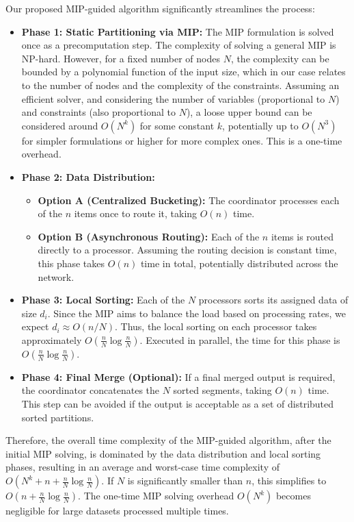 \documentclass[]{interact}
\theoremstyle{plain}
\theoremstyle{definition}
\theoremstyle{remark}
\begin{document}
Our proposed MIP-guided algorithm significantly streamlines the process:

\begin{itemize}
    \item \textbf{Phase 1: Static Partitioning via MIP:} The MIP formulation is solved once as a precomputation step. The complexity of solving a general MIP is NP-hard. However, for a fixed number of nodes $N$, the complexity can be bounded by a polynomial function of the input size, which in our case relates to the number of nodes and the complexity of the constraints. Assuming an efficient solver, and considering the number of variables (proportional to $N$) and constraints (also proportional to $N$), a loose upper bound can be considered around $O(N^k)$ for some constant $k$, potentially up to $O(N^3)$ for simpler formulations or higher for more complex ones. This is a one-time overhead.
    
    \item \textbf{Phase 2: Data Distribution:}
    \begin{itemize}
        \item \textbf{Option A (Centralized Bucketing):} The coordinator processes each of the $n$ items once to route it, taking $O(n)$ time.
        \item \textbf{Option B (Asynchronous Routing):} Each of the $n$ items is routed directly to a processor. Assuming the routing decision is constant time, this phase takes $O(n)$ time in total, potentially distributed across the network.
    \end{itemize}

    \item \textbf{Phase 3: Local Sorting:} Each of the $N$ processors sorts its assigned data of size $d_i$. Since the MIP aims to balance the load based on processing rates, we expect $d_i \approx O(n/N)$. Thus, the local sorting on each processor takes approximately $O\left(\frac{n}{N} \log \frac{n}{N}\right)$. Executed in parallel, the time for this phase is $O\left(\frac{n}{N} \log \frac{n}{N}\right)$.

    \item \textbf{Phase 4: Final Merge (Optional):} If a final merged output is required, the coordinator concatenates the $N$ sorted segments, taking $O(n)$ time. This step can be avoided if the output is acceptable as a set of distributed sorted partitions.
\end{itemize}

Therefore, the overall time complexity of the MIP-guided algorithm, after the initial MIP solving, is dominated by the data distribution and local sorting phases, resulting in an average and worst-case time complexity of $O(N^k + n + \frac{n}{N} \log \frac{n}{N})$. If $N$ is significantly smaller than $n$, this simplifies to $O(n + \frac{n}{N} \log \frac{n}{N})$. The one-time MIP solving overhead $O(N^k)$ becomes negligible for large datasets processed multiple times.
\end{document}
